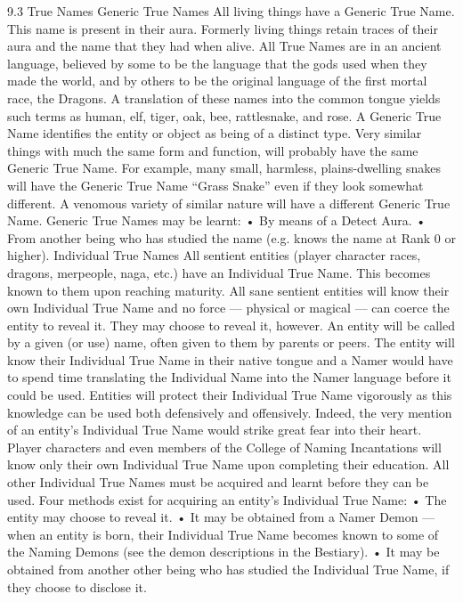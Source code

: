\documentclass[a4paper]{article}
\begin{document}
\begin{multicols}{3}
9.3 True Names
Generic True Names
All living things have a Generic True Name. This
name is present in their aura. Formerly living
things retain traces of their aura and the name that
they had when alive. All True Names are in an
ancient language, believed by some to be the language that the gods used when they made the
world, and by others to be the original language of
the first mortal race, the Dragons. A translation of
these names into the common tongue yields such
terms as human, elf, tiger, oak, bee, rattlesnake,
and rose.
A Generic True Name identifies the entity or object
as being of a distinct type. Very similar things with
much the same form and function, will probably
have the same Generic True Name. For example,
many small, harmless, plains-dwelling snakes will
have the Generic True Name “Grass Snake” even if
they look somewhat different. A venomous variety
of similar nature will have a different Generic True
Name. Generic True Names may be learnt:
• By means of a Detect Aura.
• From another being who has studied the name
(e.g. knows the name at Rank 0 or higher).
Individual True Names
All sentient entities (player character races, dragons, merpeople, naga, etc.) have an Individual True
Name. This becomes known to them upon reaching
maturity. All sane sentient entities will know their
own Individual True Name and no force — physical or magical — can coerce the entity to reveal it.
They may choose to reveal it, however. An entity
will be called by a given (or use) name, often given
to them by parents or peers. The entity will know
their Individual True Name in their native tongue
and a Namer would have to spend time translating
the Individual Name into the Namer language
before it could be used. Entities will protect their
Individual True Name vigorously as this knowledge can be used both defensively and offensively.
Indeed, the very mention of an entity’s Individual
True Name would strike great fear into their heart.
Player characters and even members of the College
of Naming Incantations will know only their own
Individual True Name upon completing their education. All other Individual True Names must be
acquired and learnt before they can be used. Four
methods exist for acquiring an entity’s Individual
True Name:
• The entity may choose to reveal it.
• It may be obtained from a Namer Demon —
when an entity is born, their Individual True Name
becomes known to some of the Naming Demons
(see the demon descriptions in the Bestiary).
• It may be obtained from another other being who
has studied the Individual True Name, if they
choose to disclose it.

\end{multicols}
\end{document}

